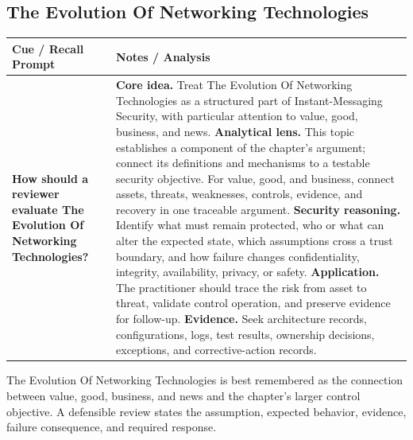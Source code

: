 \documentclass[11pt]{article}
\newcommand{\CornellHeader}{%
\rowcolor{Navy}\color{white}\bfseries Cue / Recall Prompt & \color{white}\bfseries Notes / Analysis\\\hline}
\newcommand{\CornellRow}[2]{%
\cellcolor{CueGray}\RaggedRight\textbf{#1} & \RaggedRight #2\\\hline}
\begin{document}
\subsection*{The Evolution Of Networking Technologies}
\begin{longtable}{>{\RaggedRight\arraybackslash}p{}|>{\RaggedRight\arraybackslash}p{}}
\CornellHeader
\CornellRow{How should a reviewer evaluate The Evolution Of Networking Technologies?}{\textbf{Core idea.} Treat The Evolution Of Networking Technologies as a structured part of Instant-Messaging Security, with particular attention to value, good, business, and news. \textbf{Analytical lens.} This topic establishes a component of the chapter's argument; connect its definitions and mechanisms to a testable security objective. For value, good, and business, connect assets, threats, weaknesses, controls, evidence, and recovery in one traceable argument. \textbf{Security reasoning.} Identify what must remain protected, who or what can alter the expected state, which assumptions cross a trust boundary, and how failure changes confidentiality, integrity, availability, privacy, or safety. \textbf{Application.} The practitioner should trace the risk from asset to threat, validate control operation, and preserve evidence for follow-up. \textbf{Evidence.} Seek architecture records, configurations, logs, test results, ownership decisions, exceptions, and corrective-action records.}
\end{longtable}
\begin{topicsummary}
The Evolution Of Networking Technologies is best remembered as the connection between value, good, business, and news and the chapter's larger control objective. A defensible review states the assumption, expected behavior, evidence, failure consequence, and required response.
\end{topicsummary}
\end{document}

